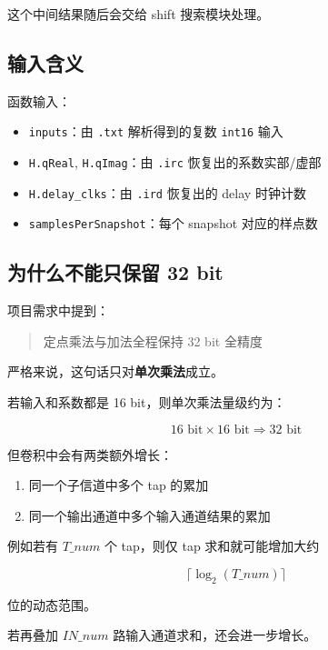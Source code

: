 \documentclass[12pt,a4paper]{article}
\begin{document}
这个中间结果随后会交给 shift 搜索模块处理。

\subsection{输入含义}

函数输入：

\begin{itemize}
\item \texttt{inputs}：由 \texttt{.txt} 解析得到的复数 \texttt{int16} 输入
\item \texttt{H.qReal}, \texttt{H.qImag}：由 \texttt{.irc} 恢复出的系数实部/虚部
\item \texttt{H.delay\_clks}：由 \texttt{.ird} 恢复出的 delay 时钟计数
\item \texttt{samplesPerSnapshot}：每个 snapshot 对应的样点数
\end{itemize}

\subsection{为什么不能只保留 32 bit}

项目需求中提到：

\begin{quote}
定点乘法与加法全程保持 32 bit 全精度
\end{quote}

严格来说，这句话只对\textbf{单次乘法}成立。

若输入和系数都是 16 bit，则单次乘法量级约为：

\begin{equation}
16 \text{ bit} \times 16 \text{ bit} \Rightarrow 32 \text{ bit}
\end{equation}

但卷积中会有两类额外增长：

\begin{enumerate}
\item 同一个子信道中多个 tap 的累加
\item 同一个输出通道中多个输入通道结果的累加
\end{enumerate}

例如若有 $T\_num$ 个 tap，则仅 tap 求和就可能增加大约

\begin{equation}
\lceil \log_2(T\_num) \rceil
\end{equation}

位的动态范围。

若再叠加 $IN\_num$ 路输入通道求和，还会进一步增长。
\end{document}
